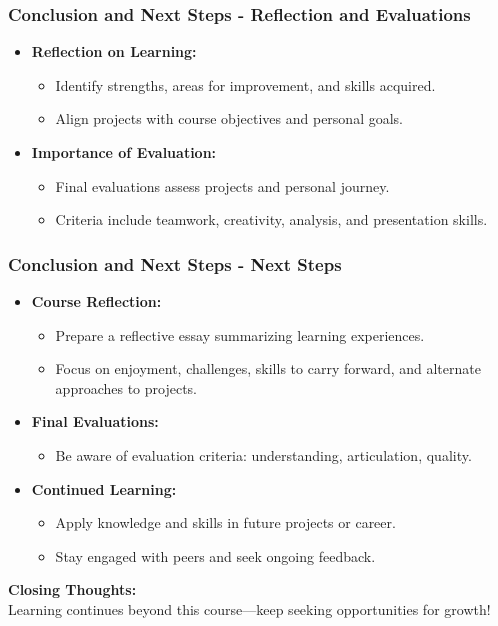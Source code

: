 \documentclass[aspectratio=169]{beamer}
\begin{document}
\begin{frame}[fragile]
    \frametitle{Conclusion and Next Steps - Reflection and Evaluations}
    \begin{itemize}
        \item \textbf{Reflection on Learning:}
        \begin{itemize}
            \item Identify strengths, areas for improvement, and skills acquired.
            \item Align projects with course objectives and personal goals.
        \end{itemize}

        \item \textbf{Importance of Evaluation:}
        \begin{itemize}
            \item Final evaluations assess projects and personal journey.
            \item Criteria include teamwork, creativity, analysis, and presentation skills.
        \end{itemize}
    \end{itemize}
\end{frame}

\begin{frame}[fragile]
    \frametitle{Conclusion and Next Steps - Next Steps}
    \begin{itemize}
        \item \textbf{Course Reflection:}
        \begin{itemize}
            \item Prepare a reflective essay summarizing learning experiences.
            \item Focus on enjoyment, challenges, skills to carry forward, and alternate approaches to projects.
        \end{itemize}

        \item \textbf{Final Evaluations:}
        \begin{itemize}
            \item Be aware of evaluation criteria: understanding, articulation, quality.
        \end{itemize}

        \item \textbf{Continued Learning:}
        \begin{itemize}
            \item Apply knowledge and skills in future projects or career.
            \item Stay engaged with peers and seek ongoing feedback.
        \end{itemize}
    \end{itemize}
    
    \textbf{Closing Thoughts:} \\
    Learning continues beyond this course—keep seeking opportunities for growth!
\end{frame}
\end{document}
